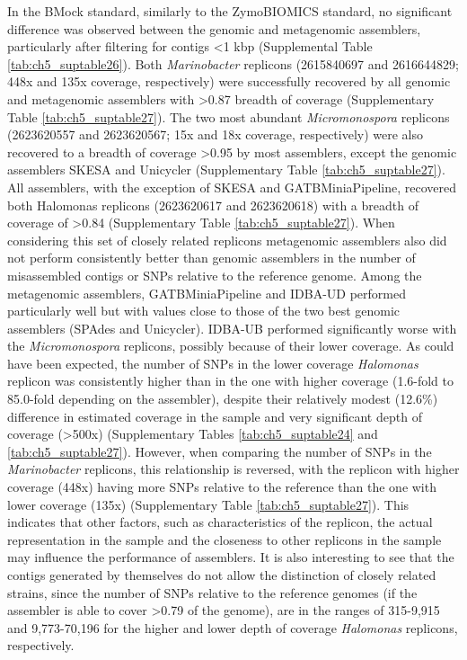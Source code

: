 In the BMock standard, similarly to the ZymoBIOMICS standard, no significant difference was observed between the genomic and metagenomic assemblers, particularly after filtering for contigs <1 kbp (Supplemental Table \ref{tab:ch5_suptable26}). Both \textit{Marinobacter} replicons (2615840697 and 2616644829; 448x and 135x coverage, respectively) were successfully recovered by all genomic and metagenomic assemblers with >0.87 breadth of coverage (Supplementary Table \ref{tab:ch5_suptable27}). The two most abundant \textit{Micromonospora} replicons (2623620557 and 2623620567; 15x and 18x coverage, respectively) were also recovered to a breadth of coverage >0.95 by most assemblers, except the genomic assemblers SKESA and Unicycler (Supplementary Table \ref{tab:ch5_suptable27}). All assemblers, with the exception of SKESA and GATBMiniaPipeline, recovered both Halomonas replicons (2623620617 and 2623620618) with a breadth of coverage of >0.84 (Supplementary Table \ref{tab:ch5_suptable27}). When considering this set of closely related replicons metagenomic assemblers also did not perform consistently better than genomic assemblers in the number of misassembled contigs or SNPs relative to the reference genome. Among the metagenomic assemblers, GATBMiniaPipeline and IDBA-UD performed particularly well but with values close to those of the two best genomic assemblers (SPAdes and Unicycler). IDBA-UB performed significantly worse with the \textit{Micromonospora} replicons, possibly because of their lower coverage. As could have been expected, the number of SNPs in the lower coverage \textit{Halomonas} replicon was consistently higher than in the one with higher coverage (1.6-fold to 85.0-fold depending on the assembler), despite their relatively modest (12.6\%) difference in estimated coverage in the sample and very significant depth of coverage (>500x) (Supplementary Tables \ref{tab:ch5_suptable24} and \ref{tab:ch5_suptable27}). However, when comparing the number of SNPs in the \textit{Marinobacter} replicons, this relationship is reversed, with the replicon with higher coverage (448x) having more SNPs relative to the reference than the one with lower coverage (135x) (Supplementary Table \ref{tab:ch5_suptable27}). This indicates that other factors, such as characteristics of the replicon, the actual representation in the sample and the closeness to other replicons in the sample may influence the performance of assemblers. It is also interesting to see that the contigs generated by themselves do not allow the distinction of closely related strains, since the number of SNPs relative to the reference genomes (if the assembler is able to cover >0.79 of the genome), are in the ranges of 315-9,915 and 9,773-70,196 for the higher and lower depth of coverage \textit{Halomonas} replicons, respectively. 

